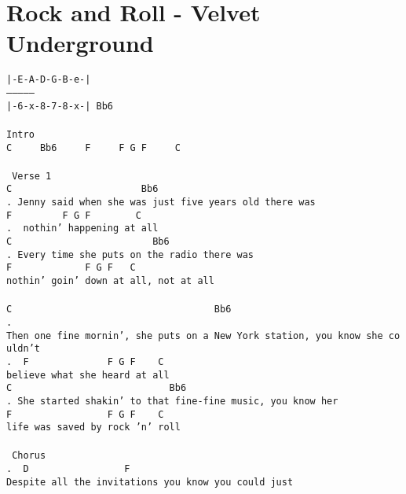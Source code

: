 \newpage
\section{Rock and Roll - Velvet Underground}
\label{Rock and Roll - Velvet Underground}
\texttt{|-E-A-D-G-B-e-|\\
---------------\\
|-6-x-8-7-8-x-|\ Bb6\\
\\
\lbrack Intro\rbrack\\
C\ \ \ \ \ Bb6\ \ \ \ \ F\ \ \ \ \ F\ G\ F\ \ \ \ \ C\\
\\
\lbrack\ Verse\ 1\rbrack\\
C\ \ \ \ \ \ \ \ \ \ \ \ \ \ \ \ \ \ \ \ \ \ \ Bb6\\
. Jenny\ said\ when\ she\ was\ just\ five\ years\ old\ there\ was\\
F\ \ \ \ \ \ \ \ \ F\ G\ F\ \ \ \ \ \ \ \ C\\
. \ nothin'\ happening\ at\ all\\
C\ \ \ \ \ \ \ \ \ \ \ \ \ \ \ \ \ \ \ \ \ \ \ \ \ Bb6\\
. Every\ time\ she\ puts\ on\ the\ radio\ there\ was\\
F\ \ \ \ \ \ \ \ \ \ \ \ \ F\ G\ F\ \ \ C\\
nothin'\ goin'\ down\ at\ all,\ not\ at\ all\\
\\
C\ \ \ \ \ \ \ \ \ \ \ \ \ \ \ \ \ \ \ \ \ \ \ \ \ \ \ \ \ \ \ \ \ \ \ \ Bb6\\
. Then\ one\ fine\ mornin',\ she\ puts\ on\ a\ New\ York\ station,\ you\ know\ she\ couldn't\\
. \ F\ \ \ \ \ \ \ \ \ \ \ \ \ \ F\ G\ F\ \ \ \ C\\
believe\ what\ she\ heard\ at\ all\\
C\ \ \ \ \ \ \ \ \ \ \ \ \ \ \ \ \ \ \ \ \ \ \ \ \ \ \ \ Bb6\\
. She\ started\ shakin'\ to\ that\ fine-fine\ music,\ you\ know\ her\\
F\ \ \ \ \ \ \ \ \ \ \ \ \ \ \ \ \ F\ G\ F\ \ \ \ C\\
life\ was\ saved\ by\ rock\ 'n'\ roll\\
\\
\lbrack\ Chorus\rbrack\\
. \ D\ \ \ \ \ \ \ \ \ \ \ \ \ \ \ \ \ F\\
Despite\ all\ the\ invitations\ you\ know\ you\ could\ just\\
}
